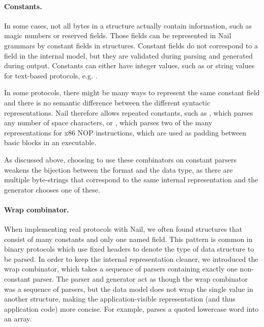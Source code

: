 
\paragraph{Constants.}
In some cases, not all bytes in a structure actually contain information, such as magic numbers or
reserved fields. Those fields can be represented in Nail grammars by constant fields in structures.
Constant fields do not correspond to a field in the internal model, but they are validated during
parsing and generated during output.  Constants can either have integer values, such as
 or string values for text-based protocols, e.g. .

In some protocols, there might be many ways to represent the same constant field
and there is no semantic difference between the different syntactic representations.
Nail therefore allows repeated constants, such as , which parses any number of space characters, or
, which parses two of the many representations for x86
NOP instructions, which are used as padding between basic blocks in an executable. 

As discussed above, choosing to use these combinators on constant parsers
weakens the bijection between the format and the data type, as there are
multiple byte-strings that correspond to the same internal representation and
the generator chooses one of these.

\paragraph{Wrap combinator.} 
When implementing real protocols with Nail, we often found
structures that consist of many constants and only one named field. This pattern is
common in binary protocols which use fixed headers to denote the type of data
structure to be parsed.  In order to keep the internal representation cleaner,
we introduced the wrap combinator, which takes a sequence of parsers containing
exactly one non-constant parser. The parser and generator act as though the wrap
combinator was a sequence of parsers, but the data model does not wrap the
single value in another structure, making the application-visible representation
(and thus application code) more concise.
For example,  parses a quoted
lowercase word into an array.

